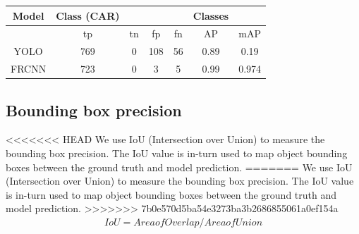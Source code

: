 \documentclass[conference]{IEEEtran}
\begin{document}
\begin{tabular}{| c | c | c | c | c | c | c | }
\hline
Model & Class (CAR)  & & & & Classes \\ 
\hline 
     & tp & tn & fp & fn & AP & mAP \\ 
YOLO & 769 & 0 &  108 & 56 & 0.89 & 0.19  \\
FRCNN & 723 & 0 & 3 & 5 & 0.99 & 0.974 \\
\hline
\end{tabular}


\subsection{Bounding box precision}
<<<<<<< HEAD
We use IoU (Intersection over Union) to measure the bounding box precision. The IoU value is in-turn used to map object bounding boxes between the ground truth and model prediction. 
=======
We use IoU (Intersection over Union) to measure the bounding box precision. The IoU value is in-turn used to map object bounding boxes between the ground truth and model prediction.
>>>>>>> 7b0e570d5ba54e3273ba3b2686855061a0ef154a
\begin{align}
{IoU}={Area of Overlap} / {Area of Union}
\end{align}

\end{document}
